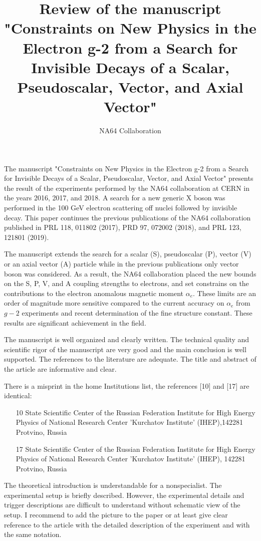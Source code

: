 \documentclass[11pt]{article}
\title{Review of the manuscript\\
"Constraints on New Physics in the Electron g-2 from a Search for Invisible Decays of
a Scalar, Pseudoscalar, Vector, and Axial Vector"}
\author{NA64 Collaboration}
\date{}                                           %
\begin{document}
\maketitle
 


The manuscript  "Constraints on New Physics in the Electron g-2 from a Search for Invisible Decays of
a Scalar, Pseudoscalar, Vector, and Axial Vector" presents the result of the experiments performed by the NA64 collaboration at CERN 
in the years 2016, 2017, and 2018. A search for a new generic X boson was performed in the 100 GeV electron scattering  off nuclei followed by invisible decay. This paper continues the previous publications of the NA64 collaboration published in PRL 118, 011802 (2017), PRD 97, 072002 (2018),  and PRL 123, 121801 (2019). 

The manuscript extends the search for a scalar (S), pseudoscalar (P), vector (V) or an axial vector (A) particle while in the previous publications only vector boson was considered. As a result, the NA64 collaboration placed the new bounds on the S, P, V, and A coupling strengths to electrons, and set constrains on the contributions to the electron anomalous magnetic moment  $\alpha_e$.
These limits 
are an order of magnitude more sensitive  compared to the current accuracy on $\alpha_e$
from $g-2$ experiments and recent determination of the fine structure constant. These results are  significant achievement in the field.

The manuscript is well organized and clearly written. 
The technical quality and scientific rigor of the manuscript are very good and the main conclusion is well supported. 
The references to the literature are adequate. 
The title and abstract of the article are informative and clear. 

There is a misprint in the home Institutions list, the references [10] and [17] are identical:
\begin{itemize}
   \item [10] State Scientific Center of the Russian Federation Institute for High Energy Physics
                 of National Research Center 'Kurchatov Institute' (IHEP),142281 Protvino, Russia
   \item [17] State Scientific Center of the Russian Federation Institute for High Energy Physics
         of National Research Center 'Kurchatov Institute' (IHEP), 142281 Protvino, Russia
\end{itemize}

The theoretical introduction is understandable  for a nonspecialist.
The experimental setup is briefly described. However, the experimental details and trigger descriptions are difficult to understand without schematic view of the setup.
I  recommend to add the picture to the paper or at least give clear reference to the article  with the detailed description of the experiment and with the same notation.
\end{document}
